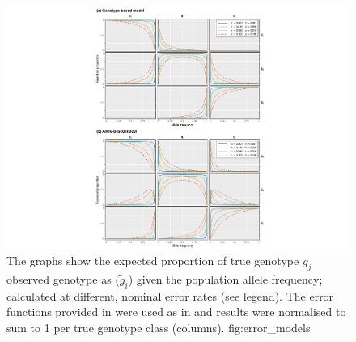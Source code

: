 

\begin{figure}[!htbp]
\includegraphics[width=\textwidth]{./img/ch4/error_models}
{The graphs show the expected proportion of true genotype $g_j$ observed genotype as ($\tilde{g}_i$) given the population allele frequency; calculated at different, nominal error rates (see legend).
The error functions provided in  were used as in  and results were normalised to sum to 1 per true genotype class (columns).\AdditionLabel}
{fig:error_models}
\end{figure}
